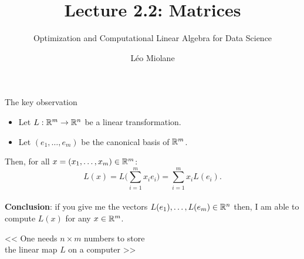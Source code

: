 \documentclass{beamer}
\title{Lecture 2.2: Matrices}
\subtitle{Optimization and Computational Linear Algebra for Data Science}
\author{Léo Miolane}
\date{}
\begin{document}
\setcounter{showProgressBar}{0}
\setcounter{showSlideNumbers}{0}

\frame{\titlepage}


\setcounter{framenumber}{0}
\setcounter{showSlideNumbers}{1}

\begin{frame}[t]{The key observation}

	\begin{itemize}
		\item Let $L: \mathbb{R}^m \to \mathbb{R}^n$ be a linear transformation.
		\item Let $(e_1, \dots, e_m)$ be the canonical basis of $\mathbb{R}^m$.
	\end{itemize}
	\vspace{0.2cm}

Then, for all $x = (x_1, \dots, x_m) \in \mathbb{R}^m$:
$$
L(x) = 
L\Big( \sum_{i=1}^m x_i e_i \Big) = \sum_{i=1}^m x_i L(e_i).
$$
\pause
\\

\textbf{Conclusion}: if you give me the vectors $L(e_1), \dots, L(e_m) \in \mathbb{R}^n$ then, I am able to compute $L(x)$ for any $x \in \mathbb{R}^m$.

\vspace{0.7cm}
\begin{center}
<< One needs $n \times m$ numbers to store\\ the linear map $L$ on a computer >>
\end{center}

\end{frame}
\end{document}
